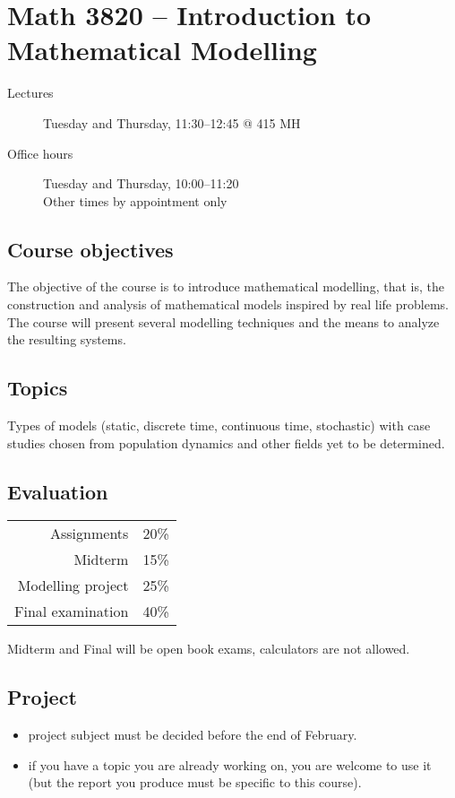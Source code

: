 \newpage
\section*{Math 3820 -- Introduction to Mathematical Modelling}

\begin{description}
\item[Lectures] Tuesday and Thursday, 11:30--12:45 @ 415 MH
\item[Office hours] Tuesday and Thursday, 10:00--11:20\\
Other times by appointment only
\end{description}


\subsection*{Course objectives}
The objective of the course is to introduce mathematical modelling, that is, the
construction and analysis of mathematical models inspired by real life problems.
The course will present several modelling techniques and the means to analyze
the resulting systems.


\subsection*{Topics}
Types of models (static, discrete time, continuous time, stochastic) with case
studies chosen from population dynamics and other fields yet to be determined.


\subsection*{Evaluation}
\begin{center}
\begin{tabular}{r|l}
Assignments & 20\% \\
Midterm & 15\% \\
Modelling project & 25\% \\
Final examination & 40\%
\end{tabular}
\end{center}
Midterm and Final will be open book exams, calculators are not allowed.


\subsection*{Project}
\begin{itemize}
\item project subject must be decided before the end of February.
\item if you have a topic you are already working on, you are welcome to use it
(but the report you produce must be specific to this course).
\end{itemize}

